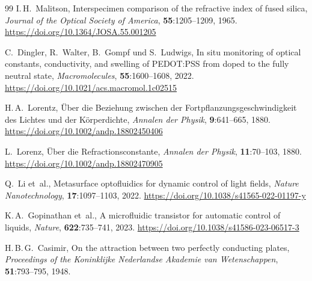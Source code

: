 ﻿\documentclass[a4paper,12pt]{article}
\theoremstyle{definition}
\begin{document}
\begin{thebibliography}{99}
		I.\,H.~Malitson,
		\newblock Interspecimen comparison of the refractive index of fused silica,
		\newblock \emph{Journal of the Optical Society of America},
		\textbf{55}:1205--1209, 1965.
		\newblock \url{https://doi.org/10.1364/JOSA.55.001205}
		
		C.~Dingler, R.~Walter, B.~Gompf und S.~Ludwigs,
		\newblock In situ monitoring of optical constants, conductivity, and swelling
		of {PEDOT:PSS} from doped to the fully neutral state,
		\newblock \emph{Macromolecules}, \textbf{55}:1600--1608, 2022.
		\newblock \url{https://doi.org/10.1021/acs.macromol.1c02515}
		
		
		H.\,A.~Lorentz,
		\newblock Über die Beziehung zwischen der Fortpflanzungsgeschwindigkeit des
		Lichtes und der Körperdichte,
		\newblock \emph{Annalen der Physik}, \textbf{9}:641--665, 1880.
		\newblock \url{https://doi.org/10.1002/andp.18802450406}
		
		L.~Lorenz,
		\newblock Über die Refractionsconstante,
		\newblock \emph{Annalen der Physik}, \textbf{11}:70--103, 1880.
		\newblock \url{https://doi.org/10.1002/andp.18802470905}
		
		
		Q.~Li et~al.,
		\newblock Metasurface optofluidics for dynamic control of light fields,
		\newblock \emph{Nature Nanotechnology}, \textbf{17}:1097--1103, 2022.
		\newblock \url{https://doi.org/10.1038/s41565-022-01197-y}
		
		K.\,A.~Gopinathan et~al.,
		\newblock A microfluidic transistor for automatic control of liquids,
		\newblock \emph{Nature}, \textbf{622}:735--741, 2023.
		\newblock \url{https://doi.org/10.1038/s41586-023-06517-3}
		
		
		H.\,B.\,G.~Casimir,
		\newblock On the attraction between two perfectly conducting plates,
		\newblock \emph{Proceedings of the Koninklijke Nederlandse Akademie van
			Wetenschappen}, \textbf{51}:793--795, 1948.
		

\end{thebibliography}
\end{document}
